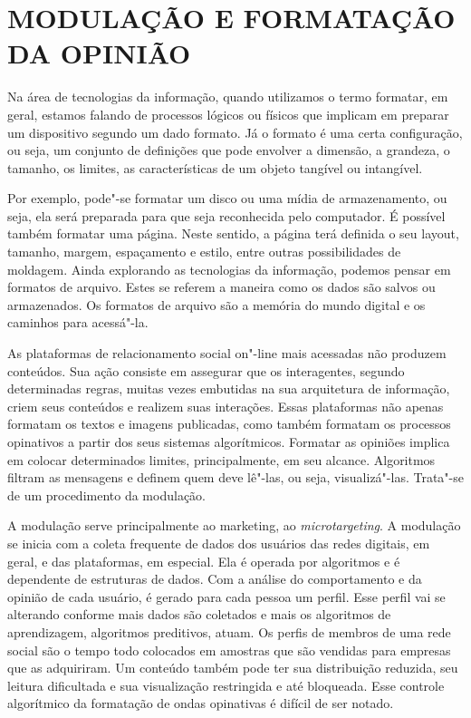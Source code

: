 \section{MODULAÇÃO E FORMATAÇÃO DA OPINIÃO}

Na área de tecnologias da informação, quando utilizamos o termo
formatar, em geral, estamos falando de processos lógicos ou físicos que
implicam em preparar um dispositivo segundo um dado formato. Já o
formato é uma certa configuração, ou seja, um conjunto de definições que
pode envolver a dimensão, a grandeza, o tamanho, os limites, as
características de um objeto tangível ou intangível.

Por exemplo, pode"-se formatar um disco ou uma mídia de armazenamento, ou
seja, ela será preparada para que seja reconhecida pelo computador. É
possível também formatar uma página. Neste sentido, a página terá
definida o seu layout, tamanho, margem, espaçamento e estilo, entre
outras possibilidades de moldagem. Ainda explorando as tecnologias da
informação, podemos pensar em formatos de arquivo. Estes se referem a
maneira como os dados são salvos ou armazenados. Os formatos de arquivo
são a memória do mundo digital e os caminhos para acessá"-la.

As plataformas de relacionamento social on"-line mais acessadas não
produzem conteúdos. Sua ação consiste em assegurar que os interagentes,
segundo determinadas regras, muitas vezes embutidas na sua arquitetura
de informação, criem seus conteúdos e realizem suas interações. Essas
plataformas não apenas formatam os textos e imagens publicadas, como
também formatam os processos opinativos a partir dos seus sistemas
algorítmicos. Formatar as opiniões implica em colocar determinados
limites, principalmente, em seu alcance. Algoritmos filtram as mensagens
e definem quem deve lê"-las, ou seja, visualizá"-las. Trata"-se de um
procedimento da modulação.

A modulação serve principalmente ao marketing, ao \emph{microtargeting}.
A modulação se inicia com a coleta frequente de dados dos usuários das
redes digitais, em geral, e das plataformas, em especial. Ela é operada
por algoritmos e é dependente de estruturas de dados. Com a análise do
comportamento e da opinião de cada usuário, é gerado para cada pessoa um
perfil. Esse perfil vai se alterando conforme mais dados são coletados e
mais os algoritmos de aprendizagem, algoritmos preditivos, atuam. Os
perfis de membros de uma rede social são o tempo todo colocados em
amostras que são vendidas para empresas que as adquiriram. Um conteúdo
também pode ter sua distribuição reduzida, seu leitura dificultada e sua
visualização restringida e até bloqueada. Esse controle algorítmico da
formatação de ondas opinativas é difícil de ser notado.


